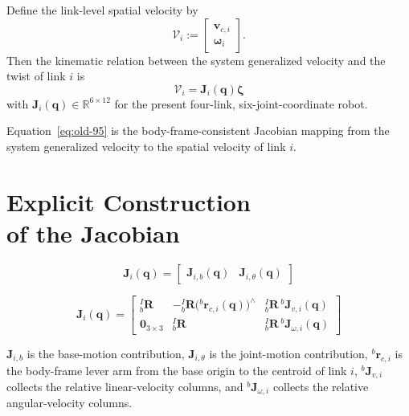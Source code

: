 \documentclass[12pt,a4paper]{report}
\newcommand{\newsymbols}[1]{\par\noindent{}#1\par\vspace{0.35em}}
\newcommand{\formulaannotation}[1]{\par\noindent{}#1\par\vspace{0.35em}}
\begin{document}
Define the link-level spatial velocity by
\begin{equation}
\mathcal{V}_i
:=
\begin{bmatrix}
\mathbf{v}_{c,i} \\
\boldsymbol{\omega}_i
\end{bmatrix}.
\end{equation}
Then the kinematic relation between the system generalized velocity and the twist of link $i$ is
\begin{equation}
\mathcal{V}_i = \mathbf{J}_i(\mathbf{q})\boldsymbol{\zeta}
\label{eq:old-95}
\end{equation}
with $\mathbf{J}_i(\mathbf{q}) \in \mathbb{R}^{6\times12}$ for the present four-link, six-joint-coordinate robot.
\formulaannotation{Equation~\eqref{eq:old-95} is the body-frame-consistent Jacobian mapping from the system generalized velocity to the spatial velocity of link $i$.}

\section[Jacobian Construction]{Explicit Construction\\ of the Jacobian}

\begin{equation}
\mathbf{J}_i(\mathbf{q})
=
\begin{bmatrix}
\mathbf{J}_{i,b}(\mathbf{q}) & \mathbf{J}_{i,\theta}(\mathbf{q})
\end{bmatrix}
\label{eq:old-96}
\end{equation}

\begin{equation}
\mathbf{J}_i(\mathbf{q})
=
\begin{bmatrix}
{}_{b}^{I}\mathbf{R} & -{}_{b}^{I}\mathbf{R}\bigl({}^{b}\mathbf{r}_{c,i}(\mathbf{q})\bigr)^\wedge & {}_{b}^{I}\mathbf{R}\,{}^{b}\mathbf{J}_{v,i}(\mathbf{q}) \\
\mathbf{0}_{3\times3} & {}_{b}^{I}\mathbf{R} & {}_{b}^{I}\mathbf{R}\,{}^{b}\mathbf{J}_{\omega,i}(\mathbf{q})
\end{bmatrix}
\label{eq:old-97}
\end{equation}
\newsymbols{$\mathbf{J}_{i,b}$ is the base-motion contribution, $\mathbf{J}_{i,\theta}$ is the joint-motion contribution, ${}^{b}\mathbf{r}_{c,i}$ is the body-frame lever arm from the base origin to the centroid of link $i$, ${}^{b}\mathbf{J}_{v,i}$ collects the relative linear-velocity columns, and ${}^{b}\mathbf{J}_{\omega,i}$ collects the relative angular-velocity columns.}
\end{document}
